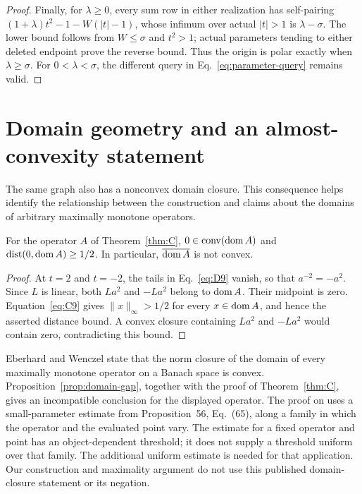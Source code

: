 \begin{proof}
Finally, for $\lambda\ge0$, every sum row in either realization has
self-pairing
$(1+\lambda)t^2-1-W(|t|-1)$, whose infimum over actual $|t|>1$ is
$\lambda-\sigma$. The lower bound follows from $W\le\sigma$ and
$t^2>1$; actual parameters tending to either deleted endpoint prove
the reverse bound. Thus the origin is polar exactly when
$\lambda\ge\sigma$. For $0<\lambda<\sigma$, the different query in
Eq.~\eqref{eq:parameter-query} remains valid.
\end{proof}


\section{Domain geometry and an almost-convexity statement}
\label{sec:domain-comparison}
The same graph also has a nonconvex domain closure. This consequence
helps identify the relationship between the construction and claims
about the domains of arbitrary maximally monotone operators.

\begin{proposition}\label{prop:domain-gap}
For the operator $A$ of Theorem~\ref{thm:C},
$0\in\operatorname{conv}(\operatorname{dom} A)$ and
$\operatorname{dist}(0,\operatorname{dom} A)\ge1/2$.
In particular, $\overline{\operatorname{dom} A}$ is not convex.
\end{proposition}
\begin{proof}
At $t=2$ and $t=-2$, the tails in Eq.~\eqref{eq:D9} vanish, so that
$a^{-2}=-a^2$. Since $L$ is linear, both $La^2$ and $-La^2$ belong
to $\operatorname{dom} A$. Their midpoint is zero. Equation~\eqref{eq:C9} gives
$\|x\|_\infty>1/2$ for every $x\in\operatorname{dom} A$, and hence the asserted
distance bound. A convex closure containing $La^2$ and $-La^2$ would
contain zero, contradicting this bound.
\end{proof}

Eberhard and Wenczel \cite[Theorem~57]{eberhardwenczel2024} state that
the norm closure of the domain of every maximally monotone operator on
a Banach space is convex. Proposition~\ref{prop:domain-gap}, together
with the proof of Theorem~\ref{thm:C}, gives an incompatible
conclusion for the displayed operator. The proof on
\cite[pp.~39--40]{eberhardwenczel2024} uses a small-parameter estimate
from Proposition~56, Eq.~(65), along a family in which the operator and
the evaluated point vary. The estimate for a fixed operator and point
has an object-dependent threshold; it does not supply a threshold
uniform over that family. The additional uniform estimate is needed
for that application. Our construction and maximality argument do not
use this published domain-closure statement or its negation.

